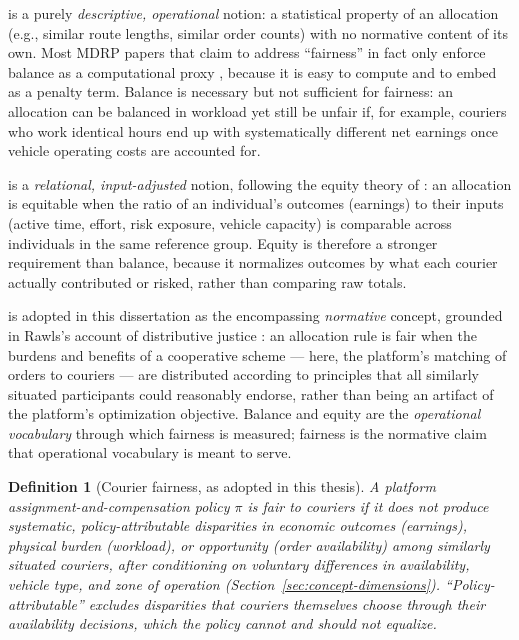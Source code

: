 \documentclass[12pt,a4paper]{report}
\newtheorem{definition}{Definition}
\begin{document}
\begin{description}[leftmargin=3cm,style=nextline]
    \item[Balance] is a purely \emph{descriptive, operational} notion: a statistical property of an allocation (e.g., similar route lengths, similar order counts) with no normative content of its own. Most MDRP papers that claim to address ``fairness'' in fact only enforce balance as a computational proxy \citep{jozefowiez2009evolutionary,ulmer2021restaurant,liao2020multi}, because it is easy to compute and to embed as a penalty term. Balance is necessary but not sufficient for fairness: an allocation can be balanced in workload yet still be unfair if, for example, couriers who work identical hours end up with systematically different net earnings once vehicle operating costs are accounted for.

    \item[Equity] is a \emph{relational, input-adjusted} notion, following the equity theory of \citet{adams1963toward}: an allocation is equitable when the ratio of an individual's outcomes (earnings) to their inputs (active time, effort, risk exposure, vehicle capacity) is comparable across individuals in the same reference group. Equity is therefore a stronger requirement than balance, because it normalizes outcomes by what each courier actually contributed or risked, rather than comparing raw totals.

    \item[Fairness] is adopted in this dissertation as the encompassing \emph{normative} concept, grounded in Rawls's account of distributive justice \citep{rawls1971theory}: an allocation rule is fair when the burdens and benefits of a cooperative scheme --- here, the platform's matching of orders to couriers --- are distributed according to principles that all similarly situated participants could reasonably endorse, rather than being an artifact of the platform's optimization objective. Balance and equity are the \emph{operational vocabulary} through which fairness is measured; fairness is the normative claim that operational vocabulary is meant to serve.
\end{description}

\begin{definition}[Courier fairness, as adopted in this thesis]
\label{def:fairness}
A platform assignment-and-compensation policy $\pi$ is \emph{fair to couriers} if it does not produce systematic, policy-attributable disparities in economic outcomes (earnings), physical burden (workload), or opportunity (order availability) among similarly situated couriers, after conditioning on voluntary differences in availability, vehicle type, and zone of operation (Section~\ref{sec:concept-dimensions}). ``Policy-attributable'' excludes disparities that couriers themselves choose through their availability decisions, which the policy cannot and should not equalize.
\end{definition}
\end{document}
